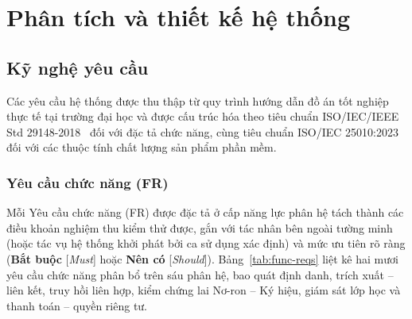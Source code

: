 \chapter{Phân tích và thiết kế hệ thống}
\label{chap:overview}

\section{Kỹ nghệ yêu cầu}

Các yêu cầu hệ thống được thu thập từ quy trình hướng dẫn đồ án tốt nghiệp thực tế tại trường đại học và được cấu trúc hóa theo tiêu chuẩn ISO/IEC/IEEE Std 29148-2018~\cite{ieee29148} đối với đặc tả chức năng, cùng tiêu chuẩn ISO/IEC 25010:2023~\cite{iso25010} đối với các thuộc tính chất lượng sản phẩm phần mềm.

\subsection{Yêu cầu chức năng (FR)}

Mỗi Yêu cầu chức năng (FR) được đặc tả ở cấp năng lực phân hệ tách thành các điều khoản nghiệm thu kiểm thử được, gắn với tác nhân bên ngoài tường minh (hoặc tác vụ hệ thống khởi phát bởi ca sử dụng xác định) và mức ưu tiên rõ ràng (\textbf{Bắt buộc} [\textit{Must}] hoặc \textbf{Nên có} [\textit{Should}]). Bảng~\ref{tab:func-reqs} liệt kê hai mươi yêu cầu chức năng phân bổ trên sáu phân hệ, bao quát định danh, trích xuất -- liên kết, truy hồi liên hợp, kiểm chứng lai Nơ-ron -- Ký hiệu, giám sát lớp học và thanh toán -- quyền riêng tư.

